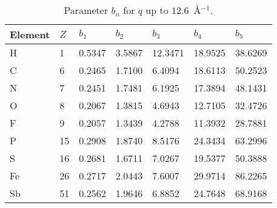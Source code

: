 \begin{table}[ht!]
  \centering
  \renewcommand*{\arraystretch}{1.5}{
    \begin{tabular}{ C{1.5cm}  C{0.5cm} C{1.4cm} C{1.4cm} C{1.4cm} C{1.4cm} C{1.4cm} }
      \toprule
      Element & $Z$ & $b_1$  & $b_2$  & $b_3$   & $b_4$   & $b_5$   \\
      \midrule
      H       & 1   & 0.5347 & 3.5867 & 12.3471 & 18.9525 & 38.6269 \\
      C       & 6   & 0.2465 & 1.7100 & 6.4094  & 18.6113 & 50.2523 \\
      N       & 7   & 0.2451 & 1.7481 & 6.1925  & 17.3894 & 48.1431 \\
      O       & 8   & 0.2067 & 1.3815 & 4.6943  & 12.7105 & 32.4726 \\
      F       & 9   & 0.2057 & 1.3439 & 4.2788  & 11.3932 & 28.7881 \\
      P       & 15  & 0.2908 & 1.8740 & 8.5176  & 24.3434 & 63.2996 \\
      S       & 16  & 0.2681 & 1.6711 & 7.0267  & 19.5377 & 50.3888 \\
      Fe      & 26  & 0.2717 & 2.0443 & 7.6007  & 29.9714 & 86.2265 \\
      Sb      & 51  & 0.2562 & 1.9646 & 6.8852  & 24.7648 & 68.9168 \\
      \bottomrule
    \end{tabular}
  }
  \caption{Parameter $b_n$ for $q$ up to $12.6$~\AA$^{-1}$.}
  \label{tab: fparameters_b}
\end{table}

